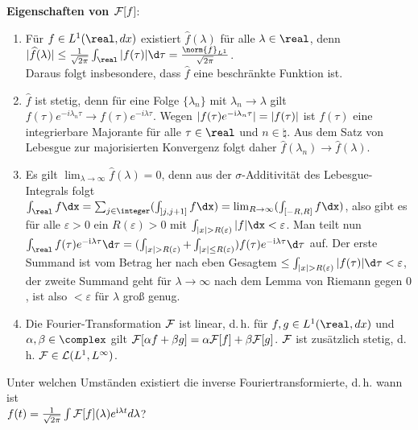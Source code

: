 \textbf{Eigenschaften von $\mathcal{F}[f]$}:
\begin{enumerate}
    \item
    Für $f \in L^1(\real, dx)$ existiert $\widehat{f}(\lambda)$ für alle
    $\lambda \in \real$, denn
    $|\widehat{f}(\lambda)| \le
    \frac{1}{\sqrt{2\pi}} \int_\real |f(\tau)| \d\tau =
    \frac{\norm{f}_{L^1}}{\sqrt{2\pi}}$.\\
    Daraus folgt insbesondere, dass
    $\widehat{f}$ eine beschränkte Funktion ist.
    
    \item
    $\widehat{f}$ ist stetig, denn für eine Folge
    $\{\lambda_n\}$ mit $\lambda_n \to \lambda$ gilt
    $f(\tau) e^{-i \lambda_n \tau} \to f(\tau) e^{-i \lambda \tau}$.
    Wegen $|f(\tau) e^{-\mathrm{i} \lambda_n \tau}| = |f(\tau)|$ ist
    $f(\tau)$ eine integrierbare Majorante für alle $\tau \in \real$ und
    $n \in \natural$.
    Aus dem Satz von Lebesgue zur majorisierten Konvergenz folgt daher
    $\widehat{f}(\lambda_n) \to \widehat{f}(\lambda)$.
    
    \item
    Es gilt $\lim_{\lambda \to \infty} \widehat{f}(\lambda) = 0$, denn
    aus der $\sigma$-Additivität des Lebesgue-Integrals folgt\\
    $\int_\real f \dx =
    \sum_{j \in \integer} (\int_{\left]j, j + 1\right]} f\dx) =
    \lim_{R \to \infty} (\int_{[-R, R]} f\dx)$, also gibt es für alle
    $\varepsilon > 0$ ein $R(\varepsilon) > 0$ mit
    $\int_{|x| > R(\varepsilon)} |f|\dx < \varepsilon$.
    Man teilt nun $\int_\real f(\tau) e^{-\i \lambda\tau} \d\tau =
    (\int_{|x| > R(\varepsilon)} + \int_{|x| \le R(\varepsilon)})
    f(\tau) e^{-\i \lambda\tau} \d\tau$ auf.
    Der erste Summand ist vom Betrag her nach eben Gesagtem
    $\le \int_{|x| > R(\varepsilon)} |f(\tau)| \d\tau < \varepsilon$,
    der zweite Summand geht für $\lambda \to \infty$ nach dem Lemma von
    Riemann gegen $0$, ist also $< \varepsilon$ für $\lambda$ groß genug.
    
    \item
    Die Fourier-Transformation $\mathcal{F}$ ist linear, d.\,h. für
    $f, g \in L^1(\real, dx)$ und $\alpha, \beta \in \complex$ gilt
    $\mathcal{F}[\alpha f + \beta g] = \alpha \mathcal{F}[f] + \beta \mathcal{F}[g]$.
    $\mathcal{F}$ ist zusätzlich stetig, d.\,h. $\mathcal{F} \in \mathcal{L}(L^1, L^\infty)$.
\end{enumerate}

\linie

Unter welchen Umständen existiert die inverse Fouriertransformierte, d.\,h.
wann ist\\
$f(t) = \frac{1}{\sqrt{2\pi}}
\int \mathcal{F}[f](\lambda) e^{\mathrm{i} \lambda t} d\lambda$?

